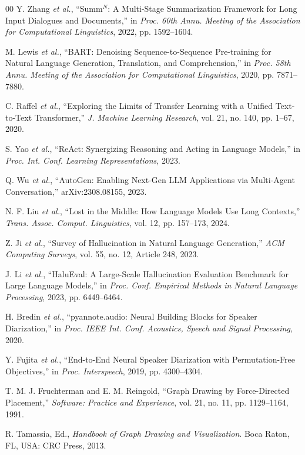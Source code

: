 \documentclass[conference]{IEEEtran}
\begin{document}
\begin{thebibliography}{00}
Y. Zhang \emph{et al.}, ``Summ$^N$: A Multi-Stage Summarization Framework for Long Input Dialogues and Documents,'' in \emph{Proc. 60th Annu. Meeting of the Association for Computational Linguistics}, 2022, pp. 1592--1604.

M. Lewis \emph{et al.}, ``BART: Denoising Sequence-to-Sequence Pre-training for Natural Language Generation, Translation, and Comprehension,'' in \emph{Proc. 58th Annu. Meeting of the Association for Computational Linguistics}, 2020, pp. 7871--7880.

C. Raffel \emph{et al.}, ``Exploring the Limits of Transfer Learning with a Unified Text-to-Text Transformer,'' \emph{J. Machine Learning Research}, vol. 21, no. 140, pp. 1--67, 2020.

S. Yao \emph{et al.}, ``ReAct: Synergizing Reasoning and Acting in Language Models,'' in \emph{Proc. Int. Conf. Learning Representations}, 2023.

Q. Wu \emph{et al.}, ``AutoGen: Enabling Next-Gen LLM Applications via Multi-Agent Conversation,'' arXiv:2308.08155, 2023.

N. F. Liu \emph{et al.}, ``Lost in the Middle: How Language Models Use Long Contexts,'' \emph{Trans. Assoc. Comput. Linguistics}, vol. 12, pp. 157--173, 2024.

Z. Ji \emph{et al.}, ``Survey of Hallucination in Natural Language Generation,'' \emph{ACM Computing Surveys}, vol. 55, no. 12, Article 248, 2023.

J. Li \emph{et al.}, ``HaluEval: A Large-Scale Hallucination Evaluation Benchmark for Large Language Models,'' in \emph{Proc. Conf. Empirical Methods in Natural Language Processing}, 2023, pp. 6449--6464.

H. Bredin \emph{et al.}, ``pyannote.audio: Neural Building Blocks for Speaker Diarization,'' in \emph{Proc. IEEE Int. Conf. Acoustics, Speech and Signal Processing}, 2020.

Y. Fujita \emph{et al.}, ``End-to-End Neural Speaker Diarization with Permutation-Free Objectives,'' in \emph{Proc. Interspeech}, 2019, pp. 4300--4304.

T. M. J. Fruchterman and E. M. Reingold, ``Graph Drawing by Force-Directed Placement,'' \emph{Software: Practice and Experience}, vol. 21, no. 11, pp. 1129--1164, 1991.

R. Tamassia, Ed., \emph{Handbook of Graph Drawing and Visualization}. Boca Raton, FL, USA: CRC Press, 2013.


\end{thebibliography}
\end{document}
